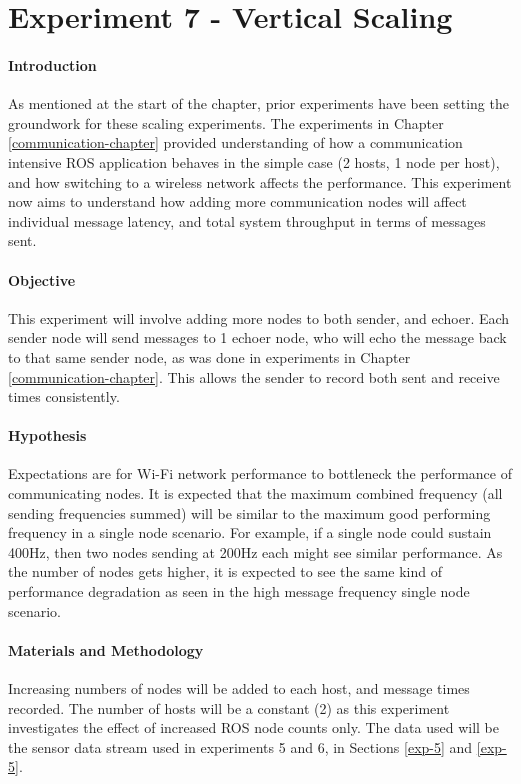 \documentclass[../dissertation.tex]{subfiles}
\begin{document}
\section{Experiment 7 - Vertical Scaling}
\label{experiment7-vertical-scaling}

\paragraph{Introduction} As mentioned at the start of the chapter, prior experiments have been setting the groundwork for these scaling experiments. The experiments in Chapter \ref{communication-chapter} provided understanding of how a communication intensive ROS application behaves in the simple case (2 hosts, 1 node per host), and how switching to a wireless network affects the performance. This experiment now aims to understand how adding more communication nodes will affect individual message latency, and total system throughput in terms of messages sent.

\paragraph{Objective} This experiment will involve adding more nodes to both sender, and echoer. Each sender node will send messages to 1 echoer node, who will echo the message back to that same sender node, as was done in experiments in Chapter \ref{communication-chapter}. This allows the sender to record both sent and receive times consistently.

\paragraph{Hypothesis} Expectations are for Wi-Fi network performance to bottleneck the performance of communicating nodes. It is expected that the maximum combined frequency (all sending frequencies summed) will be similar to the maximum good performing frequency in a single node scenario. For example, if a single node could sustain 400Hz, then two nodes sending at 200Hz each might see similar performance. As the number of nodes gets higher, it is expected to see the same kind of performance degradation as seen in the high message frequency single node scenario.

\paragraph{Materials and Methodology} Increasing numbers of nodes will be added to each host, and message times recorded. The number of hosts will be a constant (2) as this experiment investigates the effect of increased ROS node counts only. The data used will be the sensor data stream used in experiments 5 and 6, in Sections \ref{exp-5} and \ref{exp-5}.
\end{document}
